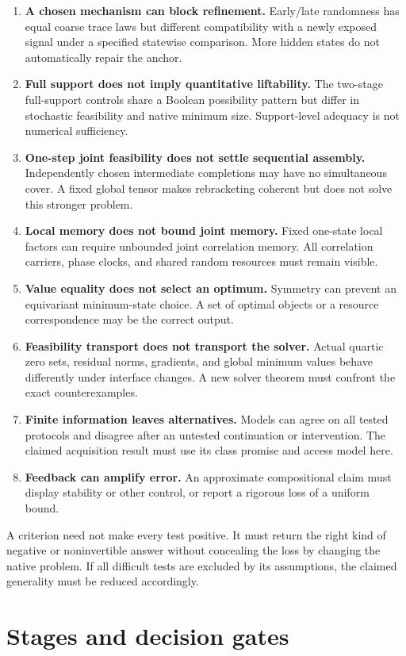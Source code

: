 \documentclass[11pt]{article}
\theoremstyle{remark}
\begin{document}
\begin{enumerate}
\item \textbf{A chosen mechanism can block refinement.} Early/late randomness has equal coarse trace laws but different compatibility with a newly exposed signal under a specified statewise comparison. More hidden states do not automatically repair the anchor.
\item \textbf{Full support does not imply quantitative liftability.} The two-stage full-support controls share a Boolean possibility pattern but differ in stochastic feasibility and native minimum size. Support-level adequacy is not numerical sufficiency.
\item \textbf{One-step joint feasibility does not settle sequential assembly.} Independently chosen intermediate completions may have no simultaneous cover. A fixed global tensor makes rebracketing coherent but does not solve this stronger problem.
\item \textbf{Local memory does not bound joint memory.} Fixed one-state local factors can require unbounded joint correlation memory. All correlation carriers, phase clocks, and shared random resources must remain visible.
\item \textbf{Value equality does not select an optimum.} Symmetry can prevent an equivariant minimum-state choice. A set of optimal objects or a resource correspondence may be the correct output.
\item \textbf{Feasibility transport does not transport the solver.} Actual quartic zero sets, residual norms, gradients, and global minimum values behave differently under interface changes. A new solver theorem must confront the exact counterexamples.
\item \textbf{Finite information leaves alternatives.} Models can agree on all tested protocols and disagree after an untested continuation or intervention. The claimed acquisition result must use its class promise and access model here.
\item \textbf{Feedback can amplify error.} An approximate compositional claim must display stability or other control, or report a rigorous loss of a uniform bound.
\end{enumerate}

A criterion need not make every test positive. It must return the right kind of negative or noninvertible answer without concealing the loss by changing the native problem. If all difficult tests are excluded by its assumptions, the claimed generality must be reduced accordingly.

\section{Stages and decision gates}
\label{sec:gates}
\end{document}
